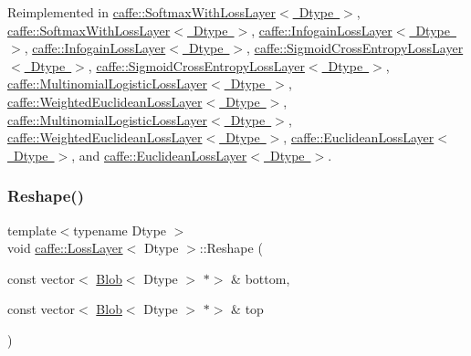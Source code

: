 Reimplemented in \mbox{\hyperlink{classcaffe_1_1_softmax_with_loss_layer_a2821b89b0f46a5e2ddaccb2708ab237b}{caffe\+::\+Softmax\+With\+Loss\+Layer$<$ Dtype $>$}}, \mbox{\hyperlink{classcaffe_1_1_softmax_with_loss_layer_ad8f5d429254deaebe4ea5f14bfa0d4d0}{caffe\+::\+Softmax\+With\+Loss\+Layer$<$ Dtype $>$}}, \mbox{\hyperlink{classcaffe_1_1_infogain_loss_layer_a83ed478450bc7f629499fed37f654c5c}{caffe\+::\+Infogain\+Loss\+Layer$<$ Dtype $>$}}, \mbox{\hyperlink{classcaffe_1_1_infogain_loss_layer_aa2903026b3886816270deb038a463759}{caffe\+::\+Infogain\+Loss\+Layer$<$ Dtype $>$}}, \mbox{\hyperlink{classcaffe_1_1_sigmoid_cross_entropy_loss_layer_a305423abeea4bd1652ff7e696aaba808}{caffe\+::\+Sigmoid\+Cross\+Entropy\+Loss\+Layer$<$ Dtype $>$}}, \mbox{\hyperlink{classcaffe_1_1_sigmoid_cross_entropy_loss_layer_a4199eb0668451022f8da20ebca129eb3}{caffe\+::\+Sigmoid\+Cross\+Entropy\+Loss\+Layer$<$ Dtype $>$}}, \mbox{\hyperlink{classcaffe_1_1_multinomial_logistic_loss_layer_a979be47987712c02dfb57a88b2a69f11}{caffe\+::\+Multinomial\+Logistic\+Loss\+Layer$<$ Dtype $>$}}, \mbox{\hyperlink{classcaffe_1_1_weighted_euclidean_loss_layer_a98e3de49ab49d66b8e3ebfe3aa4fbe20}{caffe\+::\+Weighted\+Euclidean\+Loss\+Layer$<$ Dtype $>$}}, \mbox{\hyperlink{classcaffe_1_1_multinomial_logistic_loss_layer_afd5162d1fc8be1a4abdf1afaa96519f8}{caffe\+::\+Multinomial\+Logistic\+Loss\+Layer$<$ Dtype $>$}}, \mbox{\hyperlink{classcaffe_1_1_weighted_euclidean_loss_layer_ac9b915b132fb539ffdd610992c507974}{caffe\+::\+Weighted\+Euclidean\+Loss\+Layer$<$ Dtype $>$}}, \mbox{\hyperlink{classcaffe_1_1_euclidean_loss_layer_a9cbe90ea0130c31bd5b9419a1bbaa555}{caffe\+::\+Euclidean\+Loss\+Layer$<$ Dtype $>$}}, and \mbox{\hyperlink{classcaffe_1_1_euclidean_loss_layer_ab7f1b879898ffba67cf5035f6a56d8eb}{caffe\+::\+Euclidean\+Loss\+Layer$<$ Dtype $>$}}.

\mbox{\label{classcaffe_1_1_loss_layer_abf00412194f5413ea9468ee44b0d986f}} 
\subsubsection{\texorpdfstring{Reshape()}{Reshape()}\hspace{0.1cm}{\footnotesize\ttfamily [2/2]}}
{\footnotesize\ttfamily template$<$typename Dtype $>$ \\
void \mbox{\hyperlink{classcaffe_1_1_loss_layer}{caffe\+::\+Loss\+Layer}}$<$ Dtype $>$\+::Reshape (\begin{DoxyParamCaption}\item[{const vector$<$ \mbox{\hyperlink{classcaffe_1_1_blob}{Blob}}$<$ Dtype $>$ $\ast$$>$ \&}]{bottom,  }\item[{const vector$<$ \mbox{\hyperlink{classcaffe_1_1_blob}{Blob}}$<$ Dtype $>$ $\ast$$>$ \&}]{top }\end{DoxyParamCaption})\hspace{0.3cm}{\ttfamily [virtual]}}



